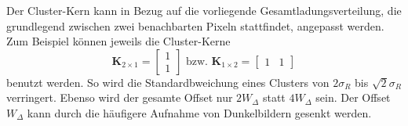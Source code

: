 \noindent
Der Cluster-Kern kann in Bezug auf die vorliegende Gesamtladungsverteilung, die grundlegend zwischen zwei benachbarten Pixeln stattfindet, angepasst werden. Zum Beispiel können jeweils die Cluster-Kerne
\begin{equation}
    \mathbf{K}_{2\times1} = \begin{bmatrix}
1\\
1
\end{bmatrix}
\text{ bzw. }
    \mathbf{K}_{1\times2} = \begin{bmatrix}
1 & 1
\end{bmatrix}
\end{equation}
benutzt werden. So wird die Standardbweichung eines Clusters von $2\sigma_R$ bis $\sqrt{2}\sigma_R$ verringert. Ebenso wird der gesamte Offset nur $2W_\Delta$ statt $4W_\Delta$ sein. Der Offset $W_\Delta$ kann durch die häufigere Aufnahme von Dunkelbildern gesenkt werden.